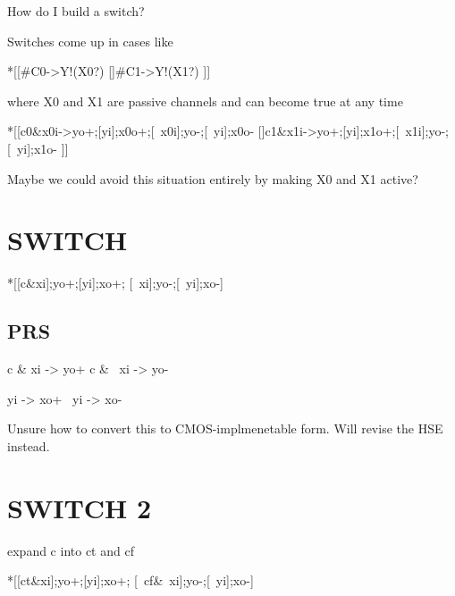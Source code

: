\documentclass{article}
\begin{document}

How do I build a switch?

Switches come up in cases like

\begin{csp}
*[[#{C0}->Y!(X0?)
  []#{C1}->Y!(X1?)
 ]]
\end{csp}

where X0 and X1 are passive channels and can become true at any time

\begin{hse}
*[[c0&x0i->yo+;[yi];x0o+;[~x0i];yo-;[~yi];x0o-
  []c1&x1i->yo+;[yi];x1o+;[~x1i];yo-;[~yi];x1o-
 ]]
\end{hse}

Maybe we could avoid this situation entirely by making X0 and X1 active?

\section{SWITCH}

\begin{hse}
*[[c&xi];yo+;[yi];xo+;
  [~xi];yo-;[~yi];xo-]
\end{hse}

\subsection{PRS}

\begin{prs2}
c & xi -> yo+
c & ~xi -> yo-

yi -> xo+
~yi -> xo-
\end{prs2}

Unsure how to convert this to CMOS-implmenetable form.
Will revise the HSE instead.

\section{SWITCH 2}

expand c into ct and cf

\begin{hse}
*[[ct&xi];yo+;[yi];xo+;
  [~cf&~xi];yo-;[~yi];xo-]
\end{hse}

\end{document}
